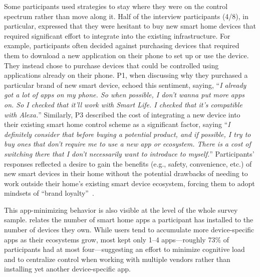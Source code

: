 Some participants used strategies to stay where they were on the control spectrum rather than move along it. Half of the interview participants (4/8), in particular, expressed that they were hesitant to buy new smart home devices that required significant effort to integrate into the existing infrastructure. For example, participants often decided against purchasing devices that required them to download a new application on their phone to set up or use the device. They instead chose to purchase devices that could be controlled using applications already on their phone. P1, when discussing why they purchased a particular brand of new smart device, echoed this sentiment, saying, ``\textit{I already got a lot of apps on my phone. So when possible, I don't wanna put more apps on. So I checked that it'll work with Smart Life. I checked that it's compatible with Alexa.}'' Similarly, P3 described the cost of integrating a new device into their existing smart home control scheme as a significant factor, saying ``\textit{I definitely consider that before buying a potential product, and if possible, I try to buy ones that don't require me to use a new app or ecosystem. There is a cost of switching there that I don't necessarily want to introduce to myself.}'' Participants' responses reflected a desire to gain the benefits (e.g., safety, convenience, etc.) of new smart devices in their home without the potential drawbacks of needing to work outside their home's existing smart device ecosystem, forcing them to adopt mindsets of ``brand loyalty''~\cite{wu2017internet}.

This app-minimizing behavior is also visible at the level of the whole survey sample.  relates the number of smart home apps a participant has installed to the number of devices they own. While users tend to accumulate more device-specific apps as their ecosystems grow, most kept only 1--4 apps---roughly 73\% of participants had at most four---suggesting an effort to minimize cognitive load and to centralize control when working with multiple vendors rather than installing yet another device-specific app.

